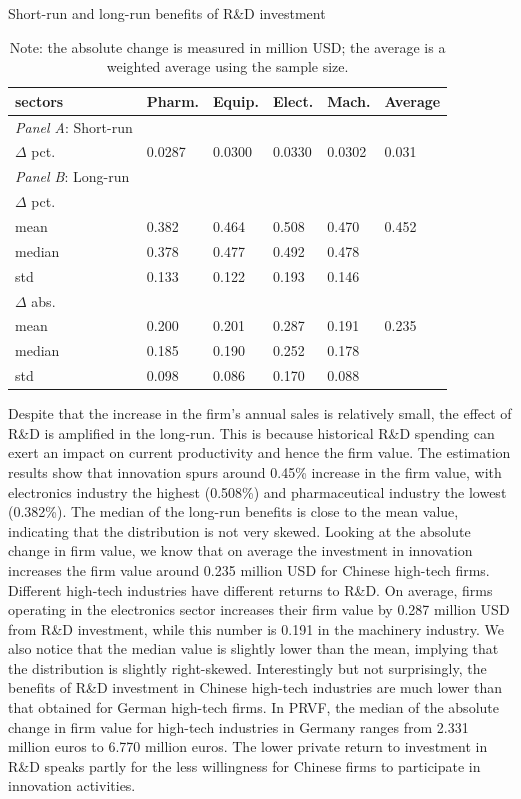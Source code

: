 \documentclass[11pt]{article}
\begin{document}
\begin{table}[h!] %
    \centering
    \caption{Short-run and long-run benefits of R\&D investment}
    \label{T17A}
    \begin{tabular}{llllll}
    \toprule
    sectors   & Pharm. & Equip. & Elect. & Mach.&Average \\
    \hline
    \textit{Panel A}: Short-run &&&& \\
    $\Delta$ pct.  & 0.0287 & 0.0300 & 0.0330 & 0.0302 & 0.031 \\
    \hline
    \textit{Panel B}: Long-run &&&& \\
    $\Delta$ pct. &&&& \\
    mean&0.382  & 0.464  & 0.508  & 0.470  & 0.452 \\
    median&0.378  & 0.477  & 0.492  & 0.478  &       \\
    std& 0.133  & 0.122  & 0.193  & 0.146  &       \\
    $\Delta$ abs.&&&& \\
    mean &0.200  & 0.201  & 0.287  & 0.191  & 0.235 \\
    median &0.185  & 0.190  & 0.252  & 0.178  &       \\
    std& 0.098  & 0.086  & 0.170  & 0.088  & \\ \bottomrule
    \end{tabular}

    \caption*{\small{}Note: the absolute change is measured in million USD; the average is a weighted average using the sample size.}{\small \par}
    \end{table}

Despite that the increase in the firm's annual sales is relatively small, the effect of R\&D is amplified in the long-run. This is because historical R\&D spending can exert an impact on current productivity and hence the firm value. The estimation results show that innovation spurs around 0.45\% increase in the firm value, with electronics industry the highest (0.508\%) and pharmaceutical industry the lowest (0.382\%). The median of the long-run benefits is close to the mean value, indicating that the distribution is not very skewed. Looking at the absolute change in firm value, we know that on average the investment in innovation increases the firm value around 0.235 million USD for Chinese high-tech firms. Different high-tech industries have different returns to R\&D. On average, firms operating in the electronics sector increases their firm value by 0.287 million USD from R\&D investment, while this number is 0.191 in the machinery industry. We also notice that the median value is slightly lower than the mean, implying that the distribution is slightly right-skewed. Interestingly but not surprisingly, the benefits of R\&D investment in Chinese high-tech industries are much lower than that obtained for German high-tech firms. In PRVF, the median of the absolute change in firm value for high-tech industries in Germany ranges from 2.331 million euros to 6.770 million euros. The lower private return to investment in R\&D speaks partly for the less willingness for Chinese firms to participate in innovation activities. 
\end{document}
